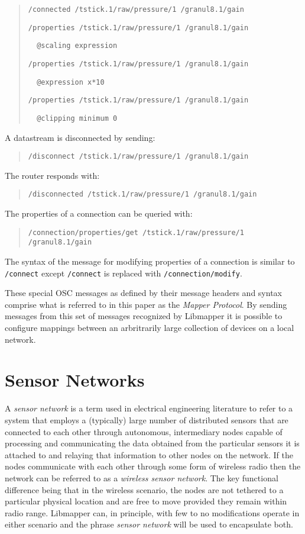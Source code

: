 \begin{quote}
\verb#/connected /tstick.1/raw/pressure/1 /granul8.1/gain#

\verb#/properties /tstick.1/raw/pressure/1 /granul8.1/gain#

\verb#  @scaling expression#

\verb#/properties /tstick.1/raw/pressure/1 /granul8.1/gain#

\verb#  @expression x*10#

\verb#/properties /tstick.1/raw/pressure/1 /granul8.1/gain#

\verb#  @clipping minimum 0#
\end{quote}

A datastream is disconnected by sending:

\begin{quote}
\verb#/disconnect /tstick.1/raw/pressure/1 /granul8.1/gain#
\end{quote}

The router responds with:

\begin{quote}
\verb#/disconnected /tstick.1/raw/pressure/1 /granul8.1/gain#
\end{quote}

The properties of a connection can be queried with:

\begin{quote}
\verb#/connection/properties/get /tstick.1/raw/pressure/1 /granul8.1/gain#
\end{quote}

The syntax of the message for modifying properties of a connection is similar to \verb#/connect# except \verb#/connect# is replaced with \verb#/connection/modify#.

These special OSC messages as defined by their message headers and syntax comprise what is referred to in this paper as the \emph{Mapper Protocol}. By sending messages from this set of messages recognized by Libmapper it is possible to configure mappings between an arbritrarily large collection of devices on a local network.

\section{Sensor Networks}

A \emph{sensor network} is a term used in electrical engineering literature to refer to a system that employs a (typically) large number of distributed sensors that are connected to each other through autonomous, intermediary nodes capable of processing and communicating the data obtained from the particular sensors it is attached to and relaying that information to other nodes on the network. If the nodes communicate with each other through some form of wireless radio then the network can be referred to as a \emph{wireless sensor network}. The key functional difference being that in the wireless scenario, the nodes are not tethered to a particular physical location and are free to move provided they remain within radio range. Libmapper can, in principle, with few to no modifications operate in either scenario and the phrase \emph{sensor network} will be used to encapsulate both.

